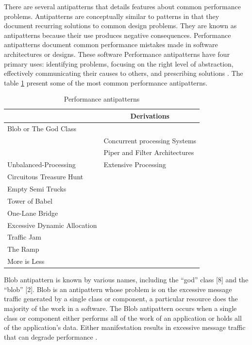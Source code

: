 \documentclass[times]{stvrauth}
\begin{document}
There are several antipatterns that details features about  common performance problems. Antipatterns are conceptually similar to patterns in that they document recurring solutions to common design problems. They are known as
antipatterns because their use produces negative consequences.  Performance antipatterns document common performance mistakes made in software architectures or designs. These software Performance antipatterns have four primary uses: identifying problems,
focusing on the
right level of abstraction,
effectively communicating
their causes to others, and prescribing solutions \cite{brown1998antipatterns}. The table \ref{antipatterns} present some of the most common performance antipatterns.


\begin{table}[H]
\centering
\caption{Performance antipatterns}
\label{antipatterns}
\begin{tabular}{|l|l|}
\hline
\rowcolor[HTML]{C0C0C0} 
\multicolumn{1}{|c|}{\cellcolor[HTML]{C0C0C0}\textbf{antipattern}} & \multicolumn{1}{c|}{\cellcolor[HTML]{C0C0C0}\textbf{Derivations}} \\ \hline
Blob or The God Class &  \\ \hline
 & Concurrent processing Systems \\ \cline{2-2} 
 & Piper and Filter Architectures \\ \cline{2-2} 
\multirow{-3}{*}{Unbalanced-Processing} & Extensive Processing \\ \hline
Circuitous Treasure Hunt &  \\ \cline{1-1}
Empty Semi Trucks &  \\ \cline{1-1}
Tower of Babel &  \\ \cline{1-1}
One-Lane Bridge &  \\ \cline{1-1}
Excessive Dynamic Allocation &  \\ \cline{1-1}
Traffic Jam &  \\ \cline{1-1}
The Ramp  &  \\ \cline{1-1}
More is Less & \multirow{-10}{*}{} \\ \hline
\end{tabular}
\end{table}

Blob antipattern is known by various names, including the “god” class [8] and the “blob” [2]. Blob is an antipattern whose problem is on the excessive message traffic generated by a single class or component, a particular resource does the majority of the work in a software. The Blob antipattern occurs when a single class or component either performs all of the work of an application or holds all of the application’s data. Either manifestation results in excessive message traffic that can degrade performance \cite{Cortellessa2007} \cite{Smith2000}.
\end{document}
